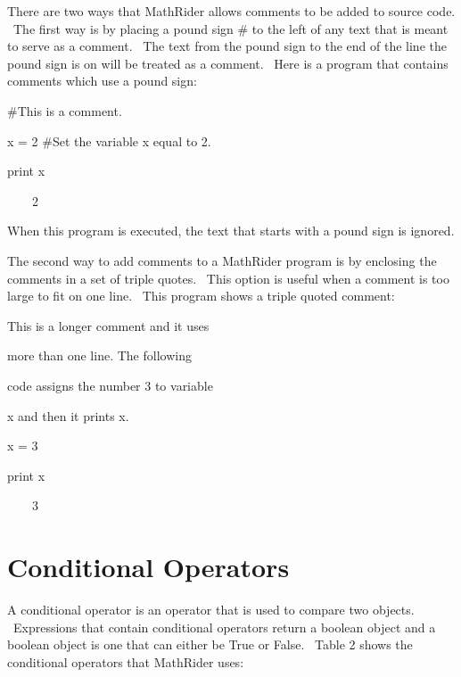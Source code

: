 \documentclass[12pt,twoside]{book}
\begin{document}
\bigskip

There are two ways that MathRider allows comments to be added to source
code. \ The first way is by placing a pound sign
{\textquotesingle}\#{\textquotesingle} to the left of any text that is
meant to serve as a comment. \ The text from the pound sign to the end
of the line the pound sign is on will be treated as a comment. \ Here
is a program that contains comments which use a pound sign:


\bigskip

\#This is a comment.

x = 2 \#Set the variable x equal to 2.

print x

{\textbar}

\ \ \ \ 2


\bigskip

When this program is executed, the text that starts with a pound sign is
ignored.


\bigskip

The second way to add comments to a MathRider program is by enclosing
the comments in a set of triple quotes. \ This option is useful when a
comment is too large to fit on one line. \ This program shows a triple
quoted comment:


\bigskip

{\textquotedbl}{\textquotedbl}{\textquotedbl}

This is a longer comment and it uses

more than one line. The following

code assigns the number 3 to variable

x and then it prints x.

{\textquotedbl}{\textquotedbl}{\textquotedbl}


\bigskip

x = 3

print x 

{\textbar}

\ \ \ \ 3

\section[Conditional Operators]{Conditional Operators}
A conditional operator is an operator that is used to compare two
objects. \ Expressions that contain conditional operators return a
boolean object and a boolean object is one that can either be True or
False. \ Table 2 shows the conditional operators that MathRider uses:
\end{document}
